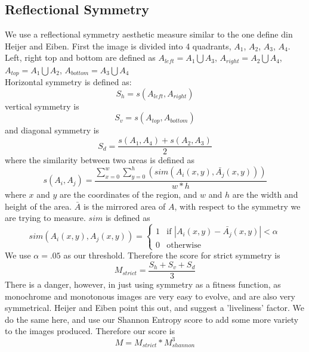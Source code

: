 \documentclass{acmart}
\begin{document}
\subsection*{Reflectional Symmetry}
We use a reflectional symmetry aesthetic measure similar to the one define din Heijer and Eiben. First the image is divided into 4 quadrants, $A_1$, $A_2$, $A_3$, $A_4$. Left, right top and bottom are defined as
$A_{left} = A_1 \bigcup A_3$, $A_{right} = A_2 \bigcup A_4$, $A_{top} = A_1 \bigcup A_2$, $A_{bottom} = A_3 \bigcup A_4$\\
Horizontal symmetry is defined as:
\begin{equation*}
    S_h = s(A_{left}, A_{right})
\end{equation*}
vertical symmetry is 
\begin{equation*}
    S_v = s(A_{top}, A_{bottom})
\end{equation*}
and diagonal symmetry is 
\begin{equation*}
    S_d = \frac{s(A_1, A_4) + s(A_2, A_3)}{2}
\end{equation*}
where the similarity between two areas is defined as 
\begin{equation*}
    s(A_i, A_j) = \frac{\sum^w_{x=0} \sum^h_{y=0}(sim(A_i(x,y), \bar{A_j}(x,y)))}{w*h}
\end{equation*}
where $x$ and $y$ are the coordinates of the region, and $w$ and $h$ are the width and height of the area. $\bar{A}$ is the mirrored area of $A$, with respect to the 
symmetry we are trying to measure. $sim$ is defined as
\[
    sim(A_i(x,y), A_j(x,y)) = 
    \begin{cases}
        1 & \text{if   } |A_i(x,y) - \bar{A_j}(x,y)| < \alpha\\
        0 & \text{otherwise}
    \end{cases}
\]
We use $\alpha = .05$ as our threshold.
Therefore the score for strict symmetry is 
\begin{equation*}
    M_{strict} = \frac{S_h + S_v + S_d}{3}
\end{equation*}
There is a danger, however, in just using symmetry as a fitness function, as monochrome and monotonous images are very easy to evolve, and are also very symmetrical. Heijer and Eiben point this out, and suggest
a 'liveliness' factor. We do the same here, and use our Shannon Entropy score to add some more variety to the images produced.
Therefore our score is 
\begin{equation*}
    M = M_{strict} * M_{shannon}^3
\end{equation*}
\end{document}
